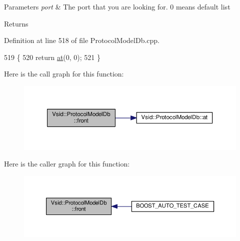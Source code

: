 \begin{DoxyParams}{Parameters}
{\em port} & The port that you are looking for. 0 means default list \\
\hline
\end{DoxyParams}
\begin{DoxyReturn}{Returns}

\end{DoxyReturn}


Definition at line 518 of file Protocol\-Model\-Db.\-cpp.


\begin{DoxyCode}
519 \{
520     \textcolor{keywordflow}{return} \hyperlink{class_vsid_1_1_protocol_model_db_a5bc72492cdde09f1bf753e0ebee26e9e}{at}(0, 0);
521 \}
\end{DoxyCode}


Here is the call graph for this function\-:
\nopagebreak
\begin{figure}[H]
\begin{center}
\leavevmode
\includegraphics[width=350pt]{class_vsid_1_1_protocol_model_db_a4209a57665d19cc6abf920a5cfb0500c_cgraph}
\end{center}
\end{figure}




Here is the caller graph for this function\-:
\nopagebreak
\begin{figure}[H]
\begin{center}
\leavevmode
\includegraphics[width=350pt]{class_vsid_1_1_protocol_model_db_a4209a57665d19cc6abf920a5cfb0500c_icgraph}
\end{center}
\end{figure}


